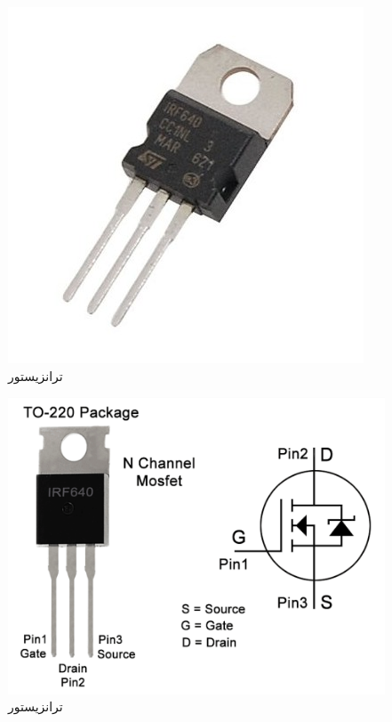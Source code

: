 \documentclass[12pt,a4paper]{article}
\begin{document}
\begin{enumerate}
		\begin{figure}[H]
			\centering
			\includegraphics[scale=0.2]{figs/irf640.jpeg}
			\caption{
				ترانزیستور 
			}
			\label{fig:schema10}
		\end{figure}
		
		\begin{figure}[H]
			\centering
			\includegraphics[scale=0.3]{figs/irf-pinout.png}
			\caption{
				ترانزیستور 
			}
			\label{fig:schema11}
		\end{figure}
			
	\end{enumerate}
	
\end{document}
